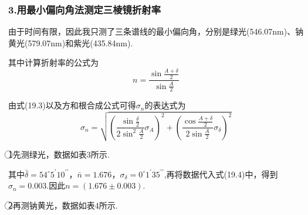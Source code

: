 \documentclass[12pt,a4paper,UTF8]{ctexart}
\begin{document}
\subsubsection*{3.用最小偏向角法测定三棱镜折射率}
由于时间有限，因此我只测了三条谱线的最小偏向角，分别是绿光(546.07nm)、钠黄光(579.07nm)和紫光(435.84nm).\par
其中计算折射率的公式为
\begin{equation}
n=\frac{\sin\frac{A+\delta}{2}}{\sin\frac{A}{2}} \tag{19.3}
\end{equation}
\par
由式(19.3)以及方和根合成公式可得$\sigma_n$的表达式为
\begin{equation}
\sigma_n=\sqrt{\left(\frac{\sin\frac{\delta}{2}}{2\sin^2\frac{A}{2}}\sigma_A\right)^2+\left(\frac{\cos\frac{A+\delta}{2}}{2\sin\frac{A}{2}}\sigma_{\delta}\right)^2} \tag{19.4}
\end{equation}
\par
\textcircled{1}先测绿光，数据如表3所示.
\begin{table}[htbp]
\centering
\caption{最小偏向角法测折射率数据表——绿光}
\end{table}
\par
其中$\bar\delta=54^{\circ}5^{\prime}10^{\prime \prime}$，$\bar n=1.676$，$\sigma_{\delta}=0^{\circ}1^{\prime}35^{\prime \prime}$,再将数据代入式(19.4)中，得到$\sigma_n=0.003$.因此$n=(1.676\pm0.003)$.\par
\textcircled{2}再测钠黄光，数据如表4所示.
\end{document}
